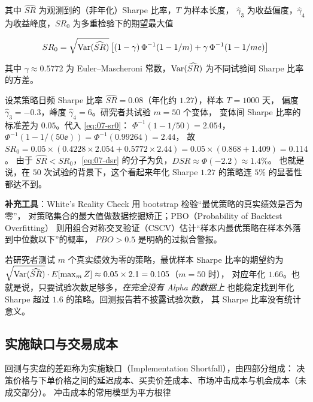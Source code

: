 其中 $\widehat{SR}$ 为观测到的（非年化）Sharpe 比率，$T$ 为样本长度，
$\hat{\gamma}_3$ 为收益偏度，$\hat{\gamma}_4$ 为收益峰度，$SR_0$ 为多重检验下的期望最大值

\begin{equation}
  SR_0 = \sqrt{\operatorname{Var}(\widehat{SR})}\left[(1-\gamma)\,\Phi^{-1}\!\left(1 - 1/m\right) + \gamma\,\Phi^{-1}\!\left(1 - 1/me\right)\right]
  \label{eq:07-sr0}
\end{equation}

其中 $\gamma \approx 0.5772$ 为 Euler--Mascheroni 常数，$\operatorname{Var}(\widehat{SR})$ 为不同试验间 Sharpe 比率的方差。

\begin{example}\label{ex:07-dsr}
设某策略日频 Sharpe 比率 $\widehat{SR} = 0.08$（年化约 $1.27$），样本 $T = 1000$ 天，
偏度 $\hat{\gamma}_3 = -0.3$，峰度 $\hat{\gamma}_4 = 6$。研究者共试验 $m = 50$ 个变体，
变体间 Sharpe 比率的标准差为 $0.05$。代入 \cref{eq:07-sr0}：
$\Phi^{-1}(1 - 1/50) = 2.054$，$\Phi^{-1}(1 - 1/(50\ee)) = \Phi^{-1}(0.99264) = 2.44$，
故 $SR_0 = 0.05 \times (0.4228 \times 2.054 + 0.5772 \times 2.44) = 0.05 \times (0.868 + 1.409) = 0.114$。
由于 $\widehat{SR} < SR_0$，\cref{eq:07-dsr} 的分子为负，$DSR \approx \Phi(-2.2) \approx 1.4\%$。
也就是说，在 $50$ 次试验的背景下，这个看起来年化 Sharpe $1.27$ 的策略连 $5\%$ 的显著性都达不到。
\end{example}

\textbf{补充工具}：White's Reality Check 用 bootstrap 检验“最优策略的真实绩效是否为零”，
对策略集合的最大值做数据挖掘矫正；PBO（Probability of Backtest Overfitting）
则用组合对称交叉验证（CSCV）估计“样本内最优策略在样本外落到中位数以下”的概率，
$PBO > 0.5$ 是明确的过拟合警报。

\begin{warningbox}[回测过拟合的数学本质]
若研究者测试 $m$ 个真实绩效为零的策略，最优样本 Sharpe 比率的期望约为
$\sqrt{\operatorname{Var}(\widehat{SR})}\cdot E[\max_m Z] \approx 0.05 \times 2.1 = 0.105$（$m=50$ 时），
对应年化 $1.66$。也就是说，只要试验次数足够多，\emph{在完全没有 Alpha 的数据上}
也能稳定找到年化 Sharpe 超过 $1.6$ 的策略。回测报告若不披露试验次数，
其 Sharpe 比率没有统计意义。
\end{warningbox}

\subsection{实施缺口与交易成本}

回测与实盘的差距称为实施缺口（Implementation Shortfall），由四部分组成：
决策价格与下单价格之间的延迟成本、买卖价差成本、市场冲击成本与机会成本（未成交部分）。
冲击成本的常用模型为平方根律

